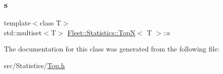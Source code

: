 \mbox{\label{class_fleet_1_1_statistics_1_1_top_n_aa17d03f1154073197161f59657d4c80b}} 
\subsubsection{\texorpdfstring{s}{s}}
{\footnotesize\ttfamily template$<$class T$>$ \\
std\+::multiset$<$T$>$ \hyperlink{class_fleet_1_1_statistics_1_1_top_n}{Fleet\+::\+Statistics\+::\+TopN}$<$ T $>$\+::s}



The documentation for this class was generated from the following file\+:\begin{DoxyCompactItemize}
\item 
src/\+Statistics/\hyperlink{_top_8h}{Top.\+h}\end{DoxyCompactItemize}
